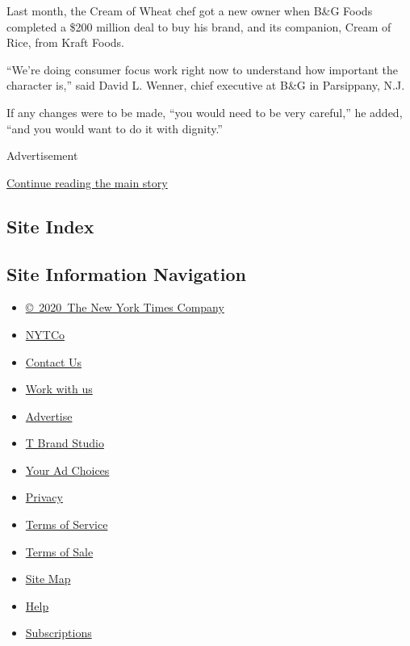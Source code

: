 Last month, the Cream of Wheat chef got a new owner when B\&G Foods
completed a \$200 million deal to buy his brand, and its companion,
Cream of Rice, from Kraft Foods.

``We're doing consumer focus work right now to understand how important
the character is,'' said David L. Wenner, chief executive at B\&G in
Parsippany, N.J.

If any changes were to be made, ``you would need to be very careful,''
he added, ``and you would want to do it with dignity.''

Advertisement

\protect\hyperlink{after-bottom}{Continue reading the main story}

\hypertarget{site-index}{%
\subsection{Site Index}\label{site-index}}

\hypertarget{site-information-navigation}{%
\subsection{Site Information
Navigation}\label{site-information-navigation}}

\begin{itemize}
\tightlist
\item
  \href{https://help.nytimes3xbfgragh.onion/hc/en-us/articles/115014792127-Copyright-notice}{©~2020~The
  New York Times Company}
\end{itemize}

\begin{itemize}
\tightlist
\item
  \href{https://www.nytco.com/}{NYTCo}
\item
  \href{https://help.nytimes3xbfgragh.onion/hc/en-us/articles/115015385887-Contact-Us}{Contact
  Us}
\item
  \href{https://www.nytco.com/careers/}{Work with us}
\item
  \href{https://nytmediakit.com/}{Advertise}
\item
  \href{http://www.tbrandstudio.com/}{T Brand Studio}
\item
  \href{https://www.nytimes3xbfgragh.onion/privacy/cookie-policy\#how-do-i-manage-trackers}{Your
  Ad Choices}
\item
  \href{https://www.nytimes3xbfgragh.onion/privacy}{Privacy}
\item
  \href{https://help.nytimes3xbfgragh.onion/hc/en-us/articles/115014893428-Terms-of-service}{Terms
  of Service}
\item
  \href{https://help.nytimes3xbfgragh.onion/hc/en-us/articles/115014893968-Terms-of-sale}{Terms
  of Sale}
\item
  \href{https://spiderbites.nytimes3xbfgragh.onion}{Site Map}
\item
  \href{https://help.nytimes3xbfgragh.onion/hc/en-us}{Help}
\item
  \href{https://www.nytimes3xbfgragh.onion/subscription?campaignId=37WXW}{Subscriptions}
\end{itemize}
